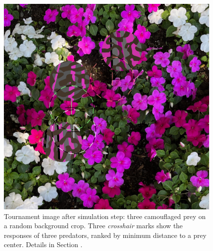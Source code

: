 \documentclass[letterpaper]{article}
\newcommand{\jargon}[1]{\textit{#1}}
\begin{document}

\begin{figure}[t]

    \centering
    \includegraphics[width=0.9\columnwidth]{20221007_0806_step_7030.png}

    \caption{Tournament image after simulation step: three camouflaged prey on a random background crop. Three \jargon{crosshair} marks show the responses of three predators, ranked by minimum distance to a prey center. Details in Section .}
    \label{fig:predator_responses}
\end{figure}



\end{document}
